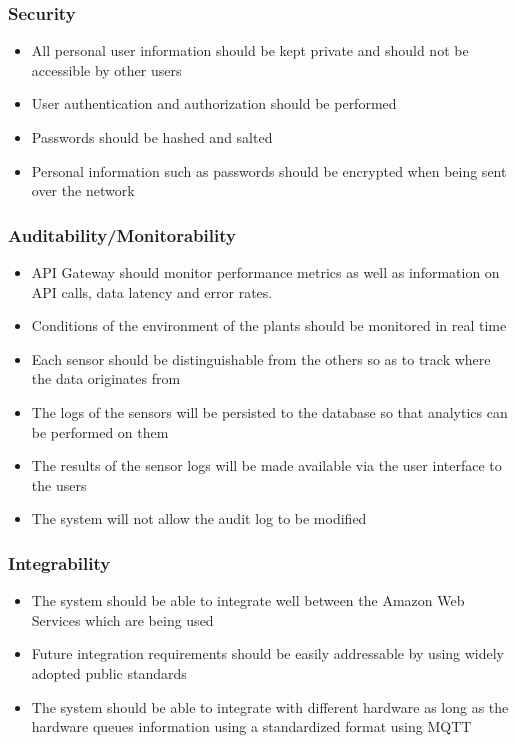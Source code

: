 \documentclass{article}
\begin{document}
		\subsubsection{Security}
			\begin{itemize}
				\item All personal user information should be kept private and should not be accessible by other users
				\item User authentication and authorization should be performed
				\item Passwords should be hashed and salted
				\item Personal information such as passwords should be encrypted when being sent over the network
			\end{itemize}
		\subsubsection{Auditability/Monitorability}
			\begin{itemize}
				\item API Gateway should monitor performance metrics as well as information on API calls, data latency and error rates.
				\item Conditions of the environment of the plants should be monitored in real time
				\item Each sensor should be distinguishable from the others so as to track where the data originates from
				\item The logs of the sensors will be persisted to the database so that analytics can be performed on them
				\item The results of the sensor logs will be made available via the user interface to the users
				\item The system will not allow the audit log to be modified
			\end{itemize}
		\subsubsection{Integrability}
			\begin{itemize}
				\item The system should be able to integrate well between the Amazon Web Services which are being used
				\item Future integration requirements should be easily addressable by using widely adopted public standards
				\item The system should be able to integrate with different hardware as long as the hardware queues information using a standardized format using MQTT
			\end{itemize}
\end{document}
